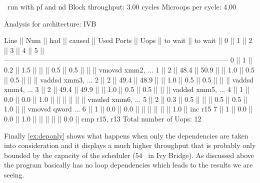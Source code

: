 \begin{LabeledExample}{\suaca\ run with pf and nd}{\label{ex:portsonly}}
    Block throughput: 3.00 cycles
    Microops per cycle: 4.00
    
    Analysis for architecture: IVB
    
     Line  ||   Num   ||   had   || caused  ||            Used Ports
           ||   Uops  || to wait || to wait ||   0   ||   1   ||   2   ||   3   ||   4   ||   5   ||
     ------------------------------------------------------------------------------------------------
       0   ||    1    ||   0.2   ||   1.5   ||       ||       ||  0.5  ||  0.5  ||       ||       || vmovsd xmm2, ...
       1   ||    2    ||  48.4   ||  50.9   ||       ||  1.0  ||  0.5  ||  0.5  ||       ||       || vaddsd xmm3, ...
       2   ||    2    ||  49.4   ||  48.9   ||       ||  1.0  ||  0.5  ||  0.5  ||       ||       || vaddsd xmm4, ...
       3   ||    2    ||  49.4   ||  49.9   ||       ||  1.0  ||  0.5  ||  0.5  ||       ||       || vaddsd xmm5, ...
       4   ||    1    ||   0.0   ||   0.0   ||  1.0  ||       ||       ||       ||       ||       || vmulsd xmm6, ...
       5   ||    2    ||   0.3   ||   0.5   ||       ||       ||  0.5  ||  0.5  ||  1.0  ||       || vmovsd qword ...
       6   ||    1    ||   0.0   ||   0.0   ||       ||       ||       ||       ||       ||  1.0  || inc r15
       7   ||    1    ||   0.0   ||   0.0   ||  1.0  ||       ||       ||       ||       ||  0.0  || cmp r15, r13
    Total number of Uops: 12
\end{LabeledExample}

Finally \autoref{ex:deponly} shows what happens when only the dependencies are taken into consideration and it displays a much higher throughput that is probably only bounded by the capacity of the scheduler ($54$ \microops\ in Ivy Bridge). As discussed above the program basically has no loop dependencies which leads to the results we are seeing.

